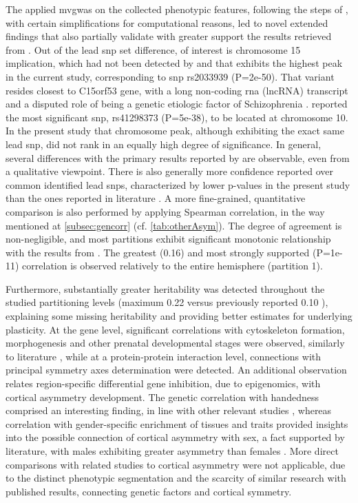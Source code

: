 The applied \ac{mvgwas} on the collected phenotypic features, following the steps of \citet{Naqvi2021}, with certain simplifications for computational reasons, led to novel extended findings that also partially validate with greater support the results retrieved from \citet{Sha2021}. Out of the lead \ac{snp} set difference, of interest is chromosome 15 implication, which had not been detected by \citet{Sha2021} and that exhibits the highest peak in the current study, corresponding to \ac{snp} rs2033939 (P=2e-50). That variant resides closest to C15orf53 gene, with a long non-coding \ac{rna} (lncRNA) transcript and a disputed role of being a genetic etiologic factor of Schizophrenia \cite{Kranz2012}. \citet{Sha2021} reported the most significant \ac{snp}, rs41298373 (P=5e-38), to be located at chromosome 10. In the present study that chromosome peak, although exhibiting the exact same lead \ac{snp}, did not rank in an equally high degree of significance. In general, several differences with the primary results reported by \citet{Sha2021} are observable, even from a qualitative viewpoint. There is also generally more confidence reported over common identified lead \acp{snp}, characterized by lower p-values in the present study than the ones reported in literature \cite{Sha2021}. A more fine-grained, quantitative comparison is also performed by applying Spearman correlation, in the way mentioned at \autoref{subsec:gencorr} \cite{Naqvi2021} (cf. \autoref{tab:otherAsym}). The degree of agreement is non-negligible, and most partitions exhibit significant monotonic relationship with the results from \citet{Sha2021}. The greatest (0.16) and most strongly supported (P=1e-11) correlation is observed relatively to the entire hemisphere (partition 1). 


Furthermore, substantially greater heritability was detected throughout the studied partitioning levels (maximum 0.22 versus previously reported 0.10 \cite{Sha2021}), explaining some missing heritability and providing better estimates for underlying plasticity. At the gene level, significant correlations with cytoskeleton formation, morphogenesis and other prenatal developmental stages were observed, similarly to literature \cite{Sha2021}, while at a protein-protein interaction level, connections with principal symmetry axes determination were detected. An additional observation relates region-specific differential gene inhibition, due to epigenomics, with cortical asymmetry development. The genetic correlation with handedness comprised an interesting finding, in line with other relevant studies \cite{Kong2021}, whereas correlation with gender-specific enrichment of tissues and traits provided insights into the possible connection of cortical asymmetry with sex, a fact supported by literature, with males exhibiting greater asymmetry than females \cite{Guadalupe2015}. More direct comparisons with related studies to cortical asymmetry were not applicable,  due to the distinct phenotypic segmentation and the scarcity of similar research with published results, connecting genetic factors and cortical symmetry.

